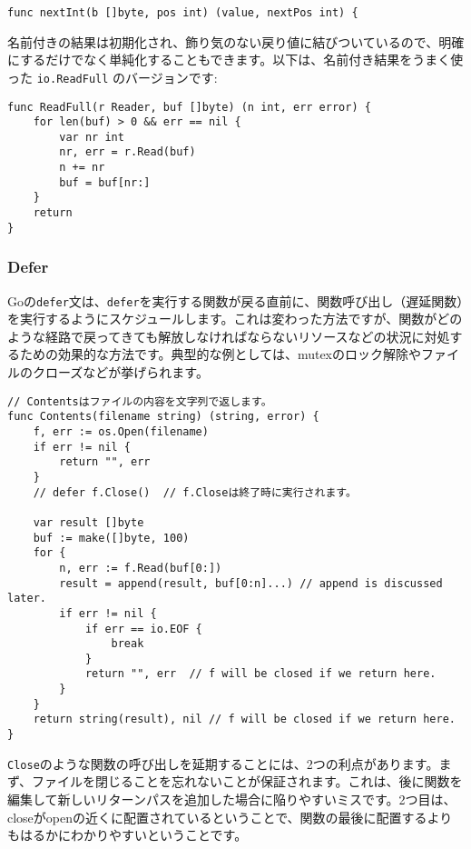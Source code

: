 \documentclass{jsarticle}
\begin{document}
\begin{lstlisting}[numbers=none]
func nextInt(b []byte, pos int) (value, nextPos int) {
\end{lstlisting}

名前付きの結果は初期化され、飾り気のない戻り値に結びついているので、明確にするだけでなく単純化することもできます。以下は、名前付き結果をうまく使った
\texttt{io.ReadFull} のバージョンです:

\begin{lstlisting}[numbers=none]
func ReadFull(r Reader, buf []byte) (n int, err error) {
    for len(buf) > 0 && err == nil {
        var nr int
        nr, err = r.Read(buf)
        n += nr
        buf = buf[nr:]
    }
    return
}
\end{lstlisting}

\subsubsection{Defer}

Goの\texttt{defer}文は、\texttt{defer}を実行する関数が戻る直前に、関数呼び出し（遅延関数）を実行するようにスケジュールします。これは変わった方法ですが、関数がどのような経路で戻ってきても解放しなければならないリソースなどの状況に対処するための効果的な方法です。典型的な例としては、mutexのロック解除やファイルのクローズなどが挙げられます。

\begin{lstlisting}[numbers=none]
// Contentsはファイルの内容を文字列で返します。
func Contents(filename string) (string, error) {
    f, err := os.Open(filename)
    if err != nil {
        return "", err
    }
    // defer f.Close()  // f.Closeは終了時に実行されます。

    var result []byte
    buf := make([]byte, 100)
    for {
        n, err := f.Read(buf[0:])
        result = append(result, buf[0:n]...) // append is discussed later.
        if err != nil {
            if err == io.EOF {
                break
            }
            return "", err  // f will be closed if we return here.
        }
    }
    return string(result), nil // f will be closed if we return here.
}
\end{lstlisting}

\texttt{Close}のような関数の呼び出しを延期することには、2つの利点があります。まず、ファイルを閉じることを忘れないことが保証されます。これは、後に関数を編集して新しいリターンパスを追加した場合に陥りやすいミスです。2つ目は、closeがopenの近くに配置されているということで、関数の最後に配置するよりもはるかにわかりやすいということです。
\end{document}
